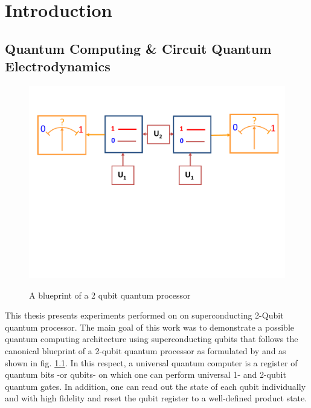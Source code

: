 \chapter{Introduction}


\section{Quantum Computing \& Circuit Quantum Electrodynamics}

\begin{figure}
	\centering
		\includegraphics[width=1.\textwidth]{./material/papers/grover/submission1/Fig1}
	\label{fig:Grover1}
	\caption{A blueprint of a 2 qubit quantum processor}
\end{figure}

This thesis presents experiments performed on on superconducting 2-Qubit quantum processor. The main goal of this work was to demonstrate a possible quantum computing architecture using superconducting qubits that follows the canonical blueprint of a 2-qubit quantum processor as formulated by \cite{diVincenzo:Criteria} and as shown in fig. \ref{fig:Grover1}. In this respect, a universal quantum computer is a register of quantum bits -or qubits- on which one can perform universal 1- and 2-qubit quantum gates. In addition, one can read out the state of each qubit individually and with high fidelity and reset the qubit register to a well-defined product state.

